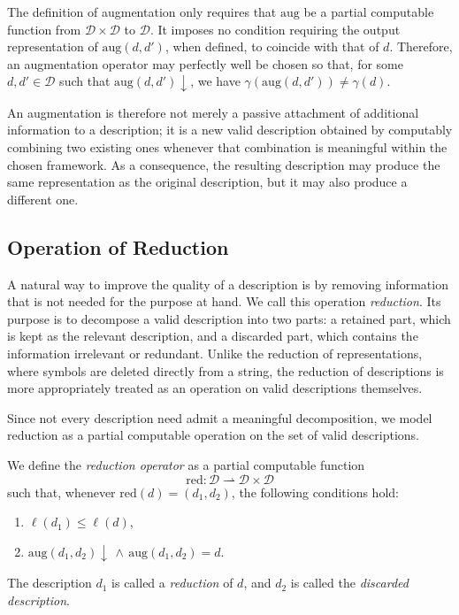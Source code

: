 The definition of augmentation only requires that \(\mathrm{aug}\) be a partial computable function from $\mathcal{D}\times\mathcal{D}$ to $\mathcal{D}$. It imposes no condition requiring the output representation of $\mathrm{aug}(d, d')$, when defined, to coincide with that of $d$. Therefore, an augmentation operator may perfectly well be chosen so that, for some $d, d' \in \mathcal{D}$ such that $\mathrm{aug}(d, d') \downarrow$, we have $\gamma(\mathrm{aug}(d,d')) \neq \gamma(d)$.

An augmentation is therefore not merely a passive attachment of additional information to a description; it is a new valid description obtained by computably combining two existing ones whenever that combination is meaningful within the chosen framework. As a consequence, the resulting description may produce the same representation as the original description, but it may also produce a different one.


\subsection*{Operation of Reduction}

A natural way to improve the quality of a description is by removing information that is not needed for the purpose at hand. We call this operation \emph{reduction}. Its purpose is to decompose a valid description into two parts: a retained part, which is kept as the relevant description, and a discarded part, which contains the information irrelevant or redundant. Unlike the reduction of representations, where symbols are deleted directly from a string, the reduction of descriptions is more appropriately treated as an operation on valid descriptions themselves.

Since not every description need admit a meaningful decomposition, we model reduction as a partial computable operation on the set of valid descriptions.

\begin{definition}
We define the \emph{reduction operator} as a partial computable function
\[
\mathrm{red} : \mathcal{D} \rightharpoonup \mathcal{D}\times\mathcal{D}
\]
such that, whenever $\mathrm{red}(d) = (d_1,d_2)$, the following conditions hold:
\begin{enumerate}[label=\roman*]
    \item $\ell(d_1) \leq \ell(d)$,
    \item $\mathrm{aug}(d_1, d_2) \downarrow \, \land \, \mathrm{aug}(d_1,d_2)=d$.
\end{enumerate}
The description $d_1$ is called a \emph{reduction} of $d$, and $d_2$ is called the \emph{discarded description}.
\end{definition}

